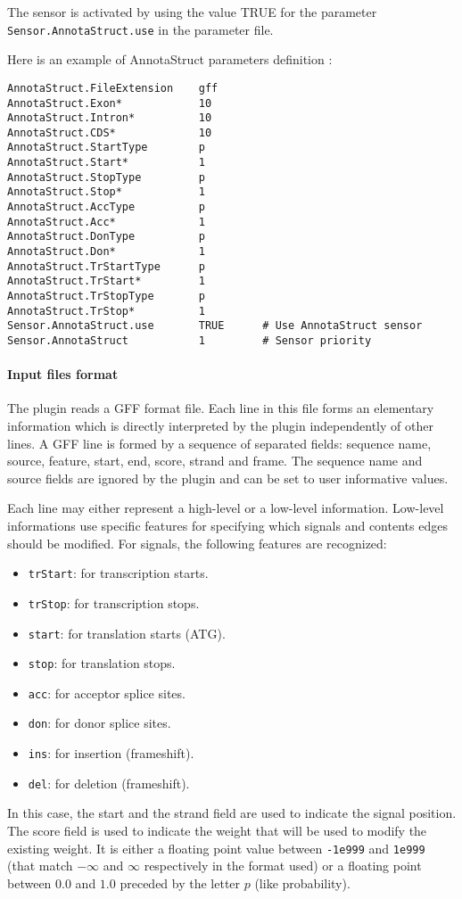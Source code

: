 The sensor is activated by using the value TRUE for the parameter
\texttt{Sensor.AnnotaStruct.use} in the parameter file.

Here is an example of AnnotaStruct parameters definition :
\begin{Verbatim}[fontsize=\small]
AnnotaStruct.FileExtension    gff
AnnotaStruct.Exon*            10
AnnotaStruct.Intron*          10
AnnotaStruct.CDS*             10
AnnotaStruct.StartType        p 
AnnotaStruct.Start*           1
AnnotaStruct.StopType         p 
AnnotaStruct.Stop*            1
AnnotaStruct.AccType          p 
AnnotaStruct.Acc*             1
AnnotaStruct.DonType          p 
AnnotaStruct.Don*             1
AnnotaStruct.TrStartType      p 
AnnotaStruct.TrStart*         1
AnnotaStruct.TrStopType       p 
AnnotaStruct.TrStop*          1
Sensor.AnnotaStruct.use       TRUE      # Use AnnotaStruct sensor
Sensor.AnnotaStruct           1         # Sensor priority
\end{Verbatim}

\paragraph{Input files format}

The plugin reads a GFF format file. Each line in this file forms an
elementary information which is directly interpreted by the plugin
independently of other lines. A GFF line is formed by a sequence of
separated fields: sequence name, source, feature, start, end, score,
strand and frame. The sequence name and source fields are ignored by
the plugin and can be set to user informative values.

Each line may either represent a high-level or a low-level
information.  Low-level informations use specific features for
specifying which signals and contents edges should be modified. For
signals, the following features are recognized:
\begin{itemize}
\item \texttt{trStart}: for transcription starts.
\item \texttt{trStop}: for transcription stops.
\item \texttt{start}: for translation starts (ATG).
\item \texttt{stop}: for translation stops.
\item \texttt{acc}: for acceptor splice sites.
\item \texttt{don}: for donor splice sites.
\item \texttt{ins}: for insertion (frameshift).
\item \texttt{del}: for deletion (frameshift).
\end{itemize}
In this case, the start and the strand field are used to indicate the
signal position. The score field is used to indicate the weight that
will be used to modify the existing weight. It is either a floating
point value between \texttt{-1e999} and \texttt{1e999} (that match
$-\infty$ and $\infty$ respectively in the format used) or a floating point
between $0.0$ and $1.0$ preceded by the letter $p$ (like probability).

